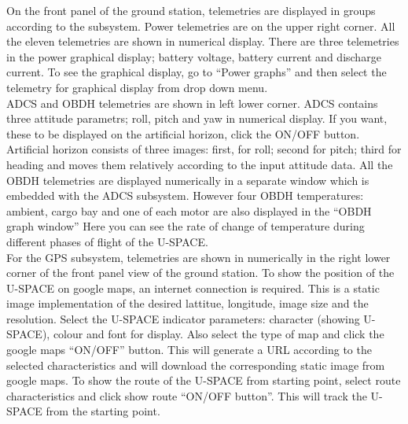 %
On the front panel of the ground station, telemetries are displayed in groups according to the subsystem. Power telemetries are on the upper right corner. All the eleven telemetries are shown in numerical display. There are three telemetries in the power graphical display; battery voltage, battery current and discharge current. To see the graphical display, go to ``Power graphs'' and then select the telemetry for graphical display from drop down menu.\\ 
\ac{ADCS} and \ac{OBDH} telemetries are shown in left lower corner. \ac{ADCS} contains three attitude parametrs; roll, pitch and yaw in numerical display. If you want, these to be displayed on the artificial horizon, click the ON/OFF button. Artificial horizon consists of three images: first, for roll; second for pitch; third for heading and moves them relatively according to the input attitude data. All the \ac{OBDH} telemetries are displayed numerically in a separate window which is embedded with the \ac{ADCS} subsystem. However four \ac{OBDH} temperatures: ambient, cargo bay and one of each motor are also displayed in the ``\ac{OBDH} graph window'' Here you can see the rate of change of temperature during different phases of flight of the \ac{U-SPACE}. \\
For the GPS subsystem, telemetries are shown in numerically in the right lower corner of the front panel view of the ground station. To show the position of the \ac{U-SPACE} on google maps, an internet connection is required. This is a static image implementation of the desired lattitue, longitude, image size and the resolution. Select the \ac{U-SPACE} indicator parameters: character (showing \ac{U-SPACE}), colour and font for display. Also select the type of map and click the google maps ``ON/OFF'' button. This will generate a \ac{URL} according to the selected characteristics and will download the corresponding static image from google maps. To show the route of the \ac{U-SPACE} from starting point, select route characteristics and click show route ``ON/OFF button''. This will track the \ac{U-SPACE} from the starting point.
